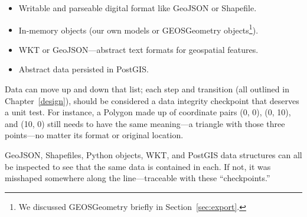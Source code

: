 \begin{itemize}
\item Writable and parseable digital format like GeoJSON or Shapefile.
\item In-memory objects (our own models or GEOSGeometry objects\footnote{We discussed GEOSGeometry briefly in Section~\ref{sec:export}.}).
\item WKT or GeoJSON---abstract text formats for geospatial features.
\item Abstract data persisted in PostGIS.
\end{itemize}

Data can move up and down that list; each step and transition (all outlined in Chapter~\ref{design}), should be considered a data integrity checkpoint that deserves a unit test. For instance, a Polygon made up of coordinate pairs (0, 0), (0, 10), and (10, 0) still needs to have the same meaning---a triangle with those three points---no matter its format or original location.

GeoJSON, Shapefiles, Python objects, WKT, and PostGIS data structures can all be inspected to see that the same data is contained in each. If not, it was misshaped somewhere along the line---traceable with these ``checkpoints.''